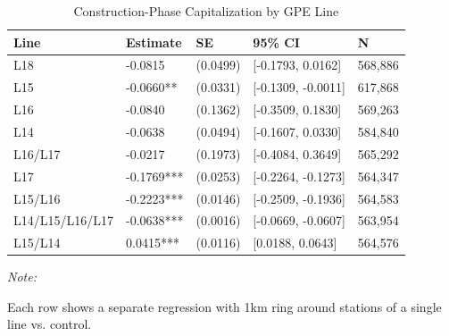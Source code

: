\begin{table}[!h]
\centering
\caption{\label{tab:tab:line_het}Construction-Phase Capitalization by GPE Line}
\centering
\begin{threeparttable}
\begin{tabular}[t]{lllll}
\toprule
Line & Estimate & SE & 95\% CI & N\\
\midrule
L18 & -0.0815 & (0.0499) & {}[-0.1793, 0.0162] & 568,886\\
L15 & -0.0660** & (0.0331) & {}[-0.1309, -0.0011] & 617,868\\
L16 & -0.0840 & (0.1362) & {}[-0.3509, 0.1830] & 569,263\\
L14 & -0.0638 & (0.0494) & {}[-0.1607, 0.0330] & 584,840\\
L16/L17 & -0.0217 & (0.1973) & {}[-0.4084, 0.3649] & 565,292\\
\addlinespace
L17 & -0.1769*** & (0.0253) & {}[-0.2264, -0.1273] & 564,347\\
L15/L16 & -0.2223*** & (0.0146) & {}[-0.2509, -0.1936] & 564,583\\
L14/L15/L16/L17 & -0.0638*** & (0.0016) & {}[-0.0669, -0.0607] & 563,954\\
L15/L14 & 0.0415*** & (0.0116) & {}[0.0188, 0.0643] & 564,576\\
\bottomrule
\end{tabular}
\begin{tablenotes}
\item \textit{Note: } 
\item Each row shows a separate regression with 1km ring around stations of a single line vs. control.
\end{tablenotes}
\end{threeparttable}
\end{table}
